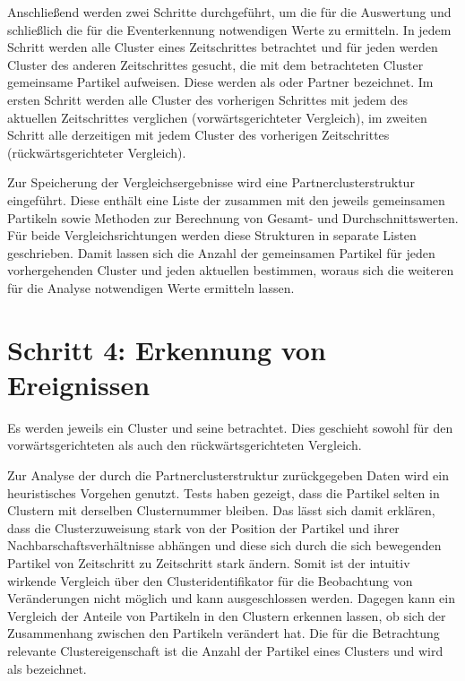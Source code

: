 Anschließend werden zwei Schritte durchgeführt, um die für die Auswertung und schließlich die für die Eventerkennung notwendigen Werte zu ermitteln. In jedem Schritt werden alle Cluster eines Zeitschrittes betrachtet und für jeden werden Cluster des anderen Zeitschrittes gesucht, die mit dem betrachteten Cluster gemeinsame Partikel aufweisen. Diese werden als  oder Partner bezeichnet. Im ersten Schritt werden alle Cluster des vorherigen Schrittes mit jedem des aktuellen Zeitschrittes verglichen (vorwärtsgerichteter Vergleich), im zweiten Schritt alle derzeitigen mit jedem Cluster des vorherigen Zeitschrittes (rückwärtsgerichteter Vergleich). 

Zur Speicherung der Vergleichsergebnisse wird eine Partnerclusterstruktur eingeführt. Diese enthält eine Liste der  zusammen mit den jeweils gemeinsamen Partikeln sowie Methoden zur Berechnung von Gesamt- und Durchschnittswerten. Für beide Vergleichsrichtungen werden diese Strukturen in separate Listen geschrieben. Damit lassen sich die Anzahl der gemeinsamen Partikel für jeden vorhergehenden Cluster und jeden aktuellen bestimmen, woraus sich die weiteren für die Analyse notwendigen Werte ermitteln lassen.

\section{Schritt 4: Erkennung von Ereignissen}\label{sec:ereigniserkennung}

Es werden jeweils ein Cluster und seine  betrachtet. Dies geschieht sowohl für den vorwärtsgerichteten als auch den rückwärtsgerichteten Vergleich.

Zur Analyse der durch die Partnerclusterstruktur zurückgegeben Daten wird ein heuristisches Vorgehen genutzt. Tests haben gezeigt, dass die Partikel selten in Clustern mit derselben Clusternummer bleiben. Das lässt sich damit erklären, dass die Clusterzuweisung stark von der Position der Partikel und ihrer Nachbarschaftsverhältnisse abhängen und diese sich durch die sich bewegenden Partikel von Zeitschritt zu Zeitschritt stark ändern. Somit ist der intuitiv wirkende Vergleich über den Clusteridentifikator für die Beobachtung von Veränderungen nicht möglich und kann ausgeschlossen werden. %
Dagegen kann ein Vergleich der Anteile von Partikeln in den Clustern erkennen lassen, ob sich der Zusammenhang zwischen den Partikeln verändert hat. Die für die Betrachtung relevante Clustereigenschaft ist die Anzahl der Partikel eines Clusters und wird als  bezeichnet.

